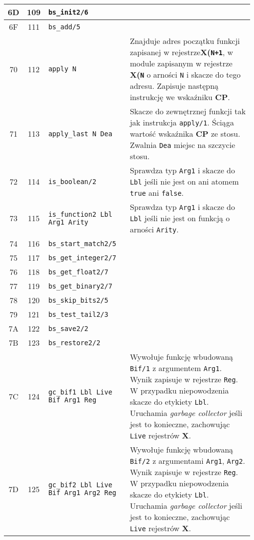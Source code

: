 \begin{longtable}{|c|c|p{5cm}|p{7cm}|}
\hline
6D & 109 & \texttt{bs\_init2/6} & \\
\hline
6F & 111 & \texttt{bs\_add/5} & \\
\hline
70 & 112 & \texttt{apply N} & Znajduje adres początku funkcji zapisanej w rejestrze\textbf{X(\texttt{N+1}}, w module zapisanym w rejestrze \textbf{X(\texttt{N}} o arności \texttt{N} i skacze do tego adresu. Zapisuje następną instrukcję we wskaźniku \textbf{CP}.\\
\hline 
71 & 113 & \texttt{apply\_last N Dea} & Skacze do zewnętrznej funkcji tak jak instrukcja \texttt{apply/1}. Ściąga wartość wskaźnika \textbf{CP} ze stosu. Zwalnia \texttt{Dea} miejsc na szczycie stosu.\\
\hline
72 & 114 & \texttt{is\_boolean/2} & Sprawdza typ \texttt{Arg1} i skacze do \texttt{Lbl} jeśli nie jest on ani atomem \texttt{true} ani \texttt{false}.\\
\hline
73 & 115 & \texttt{is\_function2 Lbl Arg1 Arity} & Sprawdza typ \texttt{Arg1} i skacze do \texttt{Lbl} jeśli nie jest on funkcją o arności \texttt{Arity}.\\
\hline
74 & 116 & \texttt{bs\_start\_match2/5} & \\
\hline
75 & 117 & \texttt{bs\_get\_integer2/7} & \\
\hline
76 & 118 & \texttt{bs\_get\_float2/7} & \\
\hline
77 & 119 & \texttt{bs\_get\_binary2/7} & \\
\hline
78 & 120 & \texttt{bs\_skip\_bits2/5} & \\
\hline
79 & 121 & \texttt{bs\_test\_tail2/3} & \\
\hline
7A & 122 & \texttt{bs\_save2/2} & \\
\hline
7B & 123 & \texttt{bs\_restore2/2} & \\
\hline
7C & 124 & \texttt{gc\_bif1 Lbl Live Bif Arg1 Reg} & Wywołuje funkcję wbudowaną \texttt{Bif/1} z argumentem \texttt{Arg1}. Wynik zapisuje w rejestrze \texttt{Reg}. W przypadku niepowodzenia skacze do etykiety \texttt{Lbl}. Uruchamia \emph{garbage collector} jeśli jest to konieczne, zachowując \texttt{Live} rejestrów \textbf{X}.\\
\hline
7D & 125 & \texttt{gc\_bif2 Lbl Live Bif Arg1 Arg2 Reg} & Wywołuje funkcję wbudowaną \texttt{Bif/2} z argumentami \texttt{Arg1}, \texttt{Arg2}. Wynik zapisuje w rejestrze \texttt{Reg}. W przypadku niepowodzenia skacze do etykiety \texttt{Lbl}. Uruchamia \emph{garbage collector} jeśli jest to konieczne, zachowując \texttt{Live} rejestrów \textbf{X}.  \\

\end{longtable}

